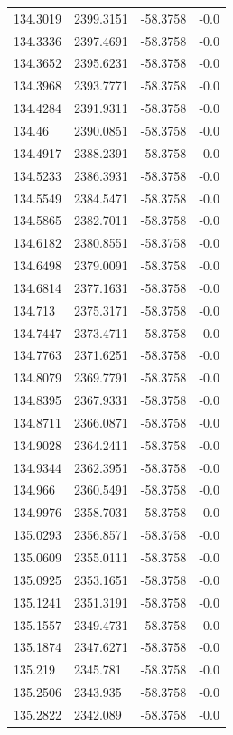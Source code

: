 \begin{table}[H]
\begin{tabular}{llll}
134.3019 & 2399.3151 & -58.3758 & -0.0 \\
134.3336 & 2397.4691 & -58.3758 & -0.0 \\
134.3652 & 2395.6231 & -58.3758 & -0.0 \\
134.3968 & 2393.7771 & -58.3758 & -0.0 \\
134.4284 & 2391.9311 & -58.3758 & -0.0 \\
134.46 & 2390.0851 & -58.3758 & -0.0 \\
134.4917 & 2388.2391 & -58.3758 & -0.0 \\
134.5233 & 2386.3931 & -58.3758 & -0.0 \\
134.5549 & 2384.5471 & -58.3758 & -0.0 \\
134.5865 & 2382.7011 & -58.3758 & -0.0 \\
134.6182 & 2380.8551 & -58.3758 & -0.0 \\
134.6498 & 2379.0091 & -58.3758 & -0.0 \\
134.6814 & 2377.1631 & -58.3758 & -0.0 \\
134.713 & 2375.3171 & -58.3758 & -0.0 \\
134.7447 & 2373.4711 & -58.3758 & -0.0 \\
134.7763 & 2371.6251 & -58.3758 & -0.0 \\
134.8079 & 2369.7791 & -58.3758 & -0.0 \\
134.8395 & 2367.9331 & -58.3758 & -0.0 \\
134.8711 & 2366.0871 & -58.3758 & -0.0 \\
134.9028 & 2364.2411 & -58.3758 & -0.0 \\
134.9344 & 2362.3951 & -58.3758 & -0.0 \\
134.966 & 2360.5491 & -58.3758 & -0.0 \\
134.9976 & 2358.7031 & -58.3758 & -0.0 \\
135.0293 & 2356.8571 & -58.3758 & -0.0 \\
135.0609 & 2355.0111 & -58.3758 & -0.0 \\
135.0925 & 2353.1651 & -58.3758 & -0.0 \\
135.1241 & 2351.3191 & -58.3758 & -0.0 \\
135.1557 & 2349.4731 & -58.3758 & -0.0 \\
135.1874 & 2347.6271 & -58.3758 & -0.0 \\
135.219 & 2345.781 & -58.3758 & -0.0 \\
135.2506 & 2343.935 & -58.3758 & -0.0 \\
135.2822 & 2342.089 & -58.3758 & -0.0 \\

\end{tabular}
\end{table}
